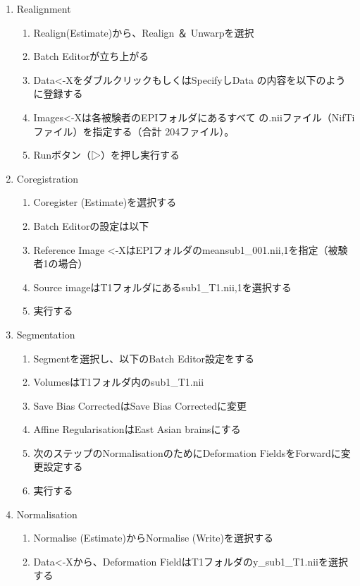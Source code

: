 \documentclass{jlreq}
\begin{document}
\begin{enumerate}
    \item Realignment
    \begin{enumerate}
        \item Realign(Estimate)から、Realign ＆ Unwarpを選択
        \item Batch Editorが立ち上がる
        \item Data<-XをダブルクリックもしくはSpecifyしData
の内容を以下のように登録する 
        \item Images<-Xは各被験者のEPIフォルダにあるすべて
の.niiファイル（NifTiファイル）を指定する（合計
204ファイル）。
        \item Runボタン（▷）を押し実行する 
    \end{enumerate}

    \item Coregistration
    \begin{enumerate}
        \item Coregister (Estimate)を選択する
        \item Batch Editorの設定は以下
        \item Reference Image <-XはEPIフォルダのmeansub1\_001.nii,1を指定（被験者1の場合）
        \item Source imageはT1フォルダにあるsub1\_T1.nii,1を選択する
        \item 実行する
    \end{enumerate}
    \item Segmentation
    \begin{enumerate}
        \item Segmentを選択し、以下のBatch Editor設定をする
        \item VolumesはT1フォルダ内のsub1\_T1.nii
        \item Save Bias CorrectedはSave Bias Correctedに変更
        \item Affine RegularisationはEast Asian brainsにする
        \item 次のステップのNormalisationのためにDeformation FieldsをForwardに変更設定する
        \item 実行する
    \end{enumerate}
    \item Normalisation
    \begin{enumerate}
        \item Normalise (Estimate)からNormalise (Write)を選択する
        \item Data<-Xから、Deformation FieldはT1フォルダのy\_sub1\_T1.niiを選択する

\end{enumerate}
\end{enumerate}
\end{document}
